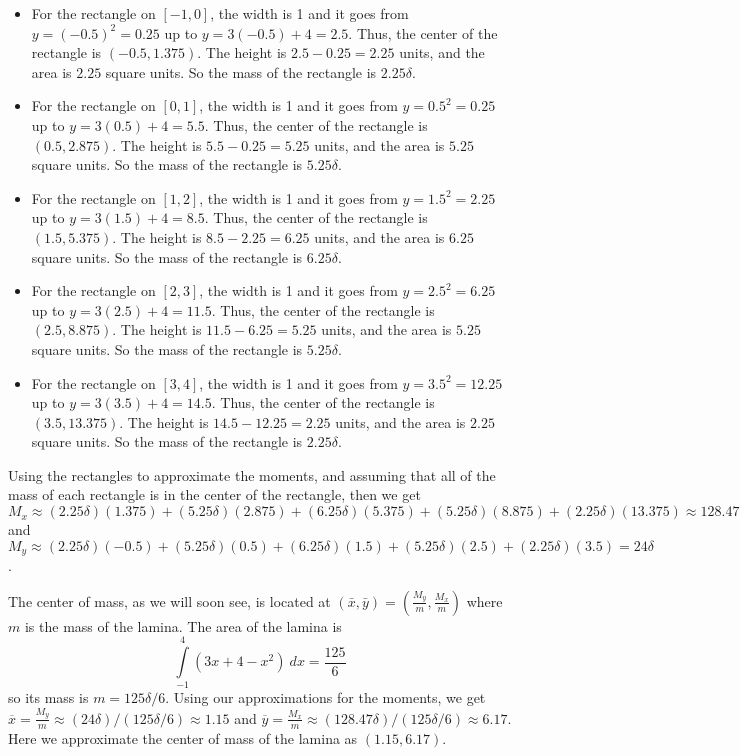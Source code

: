 \begin{itemize}
\item For the rectangle on $[-1,0]$, the width is 1 and it goes from $y=(-0.5)^2=0.25$ up to $y=3(-0.5)+4=2.5$.  Thus, the center of the rectangle is $(-0.5, 1.375)$.  The height is $2.5-0.25 = 2.25$ units, and the area is $2.25$ square units.  So the mass of the rectangle is $2.25\delta$.
\item For the rectangle on $[0,1]$, the width is 1 and it goes from $y=0.5^2=0.25$ up to $y=3(0.5)+4=5.5$.  Thus, the center of the rectangle is $(0.5, 2.875)$.  The height is $5.5-0.25 = 5.25$ units, and the area is $5.25$ square units.  So the mass of the rectangle is $5.25\delta$.
\item For the rectangle on $[1,2]$, the width is 1 and it goes from $y=1.5^2=2.25$ up to $y=3(1.5)+4=8.5$.  Thus, the center of the rectangle is $(1.5, 5.375)$.  The height is $8.5-2.25 = 6.25$ units, and the area is $6.25$ square units.  So the mass of the rectangle is $6.25\delta$.
\item For the rectangle on $[2,3]$, the width is 1 and it goes from $y=2.5^2=6.25$ up to $y=3(2.5)+4=11.5$.  Thus, the center of the rectangle is $(2.5, 8.875)$.  The height is $11.5-6.25 = 5.25$ units, and the area is $5.25$ square units.  So the mass of the rectangle is $5.25\delta$.
\item For the rectangle on $[3,4]$, the width is 1 and it goes from $y=3.5^2=12.25$ up to $y=3(3.5)+4=14.5$.  Thus, the center of the rectangle is $(3.5, 13.375)$.  The height is $14.5-12.25 = 2.25$ units, and the area is $2.25$ square units.  So the mass of the rectangle is $2.25\delta$.
\end{itemize}

Using the rectangles to approximate the moments, and assuming that all of the mass of each rectangle is in the center of the rectangle, then we get $M_x \approx (2.25\delta)(1.375) + (5.25\delta)(2.875) + (6.25\delta)(5.375) + (5.25\delta)(8.875) + (2.25\delta)(13.375) \approx 128.47\delta$ and $M_y \approx (2.25\delta)(-0.5) + (5.25\delta)(0.5) + (6.25\delta)(1.5) + (5.25\delta)(2.5) + (2.25\delta)(3.5) = 24\delta$.

The center of mass, as we will soon see, is located at $\left(\bar{x}, \bar{y}\right) = \left(\frac{M_y}{m}, \frac{M_x}{m}\right)$ where
$m$ is the mass of the lamina.  The area of the lamina is
$$\int\limits_{-1}^4 \left(3x+4-x^2\right)\ dx = \frac{125}{6}$$
so its mass is $m=125\delta/6$.  Using our approximations for the moments, we get $\overline{x} = \frac{M_y}{m} \approx (24\delta)/(125\delta/6) \approx 1.15$ and $\overline{y} = \frac{M_x}{m}\approx (128.47\delta)/(125\delta/6) \approx 6.17$.
Here we approximate the center of mass of the lamina as $(1.15, 6.17)$.

